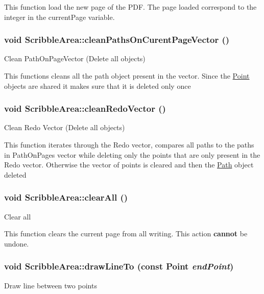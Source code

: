 This function load the new page of the PDF. The page loaded correspond to the integer in the currentPage variable. \hypertarget{classScribbleArea_aab4bb1eafc6af60c8c0e2127811c762f}{
\subsubsection[{cleanPathsOnCurentPageVector}]{\setlength{\rightskip}{0pt plus 5cm}void ScribbleArea::cleanPathsOnCurentPageVector ()}}
\label{classScribbleArea_aab4bb1eafc6af60c8c0e2127811c762f}
Clean PathOnPageVector (Delete all objects)

This functions cleans all the path object present in the vector. Since the \hyperlink{classPoint}{Point} objects are shared it makes sure that it is deleted only once \hypertarget{classScribbleArea_affc463bc10a01e700e8bce98f83ea0c4}{
\subsubsection[{cleanRedoVector}]{\setlength{\rightskip}{0pt plus 5cm}void ScribbleArea::cleanRedoVector ()}}
\label{classScribbleArea_affc463bc10a01e700e8bce98f83ea0c4}
Clean Redo Vector (Delete all objects)

This function iterates through the Redo vector, compares all paths to the paths in PathOnPages vector while deleting only the points that are only present in the Redo vector. Otherwise the vector of points is cleared and then the \hyperlink{classPath}{Path} object deleted \hypertarget{classScribbleArea_a78dbfd362afddb2bf4e91fbc14ff8f9e}{
\subsubsection[{clearAll}]{\setlength{\rightskip}{0pt plus 5cm}void ScribbleArea::clearAll ()}}
\label{classScribbleArea_a78dbfd362afddb2bf4e91fbc14ff8f9e}
Clear all

This function clears the current page from all writing. This action {\bfseries cannot} be undone. \hypertarget{classScribbleArea_ad5504d85e087b341d914b322088fecf5}{
\subsubsection[{drawLineTo}]{\setlength{\rightskip}{0pt plus 5cm}void ScribbleArea::drawLineTo (const {\bf Point} {\em endPoint})}}
\label{classScribbleArea_ad5504d85e087b341d914b322088fecf5}
Draw line between two points


